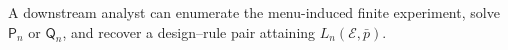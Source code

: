 A downstream analyst can enumerate the menu-induced finite experiment, solve \(\mathsf P_n\) or \(\mathsf Q_n\), and recover a design--rule pair attaining \(L_n(\mathcal E,\bar p)\).